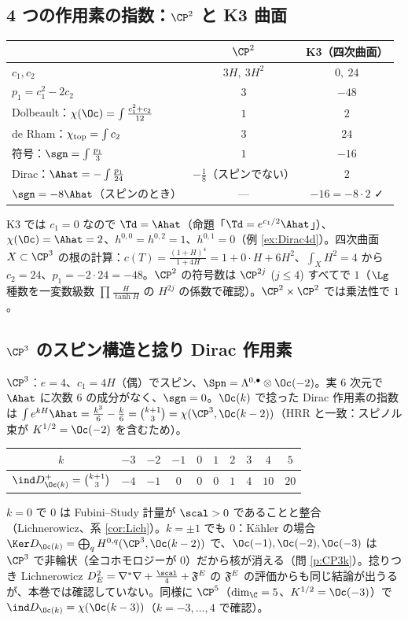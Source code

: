 \subsection{4 つの作用素の指数：$\CP^2$ と K3 曲面}
\begin{center}
{\small\begin{tabular}{l|cc}
\toprule
 & $\CP^2$ & K3（四次曲面）\\
\midrule
$c_1,c_2$ & $3H,\ 3H^2$ & $0,\ 24$\\
$p_1=c_1^2-2c_2$ & $3$ & $-48$\\
Dolbeault：$\chi(\Oc)=\int\frac{c_1^2+c_2}{12}$ & $1$ & $2$\\
de Rham：$\chi_{\rm top}=\int c_2$ & $3$ & $24$\\
符号：$\sgn=\int\frac{p_1}3$ & $1$ & $-16$\\
Dirac：$\Ahat=-\int\frac{p_1}{24}$ & $-\frac18$（スピンでない） & $2$\\
$\sgn=-8\Ahat$（スピンのとき） & --- & $-16=-8\cdot2$ ✓\\
\bottomrule
\end{tabular}}
\end{center}
K3 では $c_1=0$ なので $\Td=\Ahat$（命題「$\Td=e^{c_1/2}\Ahat$」）、$\chi(\Oc)=\Ahat=2$、$h^{0,0}=h^{0,2}=1$、$h^{0,1}=0$（例 \ref{ex:Dirac4d}）。四次曲面 $X\subset\CP^3$ の根の計算：$c(T)=\frac{(1+H)^4}{1+4H}=1+0\cdot H+6H^2$、$\int_XH^2=4$ から $c_2=24$、$p_1=-2\cdot24=-48$。$\CP^2$ の符号数は $\CP^{2j}$ ($j\le4$) すべてで $1$（$\Lg$ 種数を一変数級数 $\prod\frac{H}{\tanh H}$ の $H^{2j}$ の係数で確認）。$\CP^2\times\CP^2$ では乗法性で $1$。

\subsection{$\CP^3$ のスピン構造と捻り Dirac 作用素}
$\CP^3$：$e=4$、$c_1=4H$（偶）でスピン、$\Spn=\Lambda^{0,\bullet}\otimes\Oc(-2)$。実 6 次元で $\Ahat$ に次数 6 の成分がなく、$\sgn=0$。$\Oc(k)$ で捻った Dirac 作用素の指数は $\int e^{kH}\Ahat=\frac{k^3}6-\frac k6=\binom{k+1}3=\chi(\CP^3,\Oc(k-2))$（HRR と一致：スピノル束が $K^{1/2}=\Oc(-2)$ を含むため）。
\begin{center}
{\small\begin{tabular}{c|ccccccccc}
\toprule
$k$ & $-3$ & $-2$ & $-1$ & $0$ & $1$ & $2$ & $3$ & $4$ & $5$\\
\midrule
$\ind D_{\Oc(k)}^+=\binom{k+1}3$ & $-4$ & $-1$ & $0$ & $0$ & $0$ & $1$ & $4$ & $10$ & $20$\\
\bottomrule
\end{tabular}}
\end{center}
$k=0$ で $0$ は Fubini--Study 計量が $\scal>0$ であることと整合（Lichnerowicz、系 \ref{cor:Lich}）。$k=\pm1$ でも $0$：Kähler の場合 $\Ker D_{\Oc(k)}=\bigoplus_q H^{0,q}(\CP^3,\Oc(k-2))$ で、$\Oc(-1),\Oc(-2),\Oc(-3)$ は $\CP^3$ で非輪状（全コホモロジーが $0$）だから核が消える（問 \ref{p:CP3k}）。捻りつき Lichnerowicz $D_E^2=\nabla^*\nabla+\frac{\scal}4+\frak F^E$ の $\frak F^E$ の評価からも同じ結論が出うるが、本巻では確認していない。同様に $\CP^5$（$\dim_{\C}=5$、$K^{1/2}=\Oc(-3)$）で $\ind D_{\Oc(k)}=\chi(\Oc(k-3))$（$k=-3,\dots,4$ で確認）。

